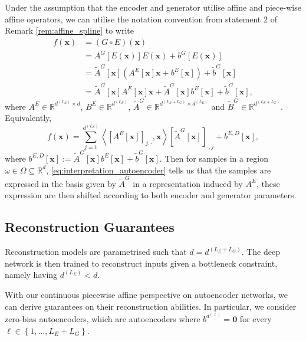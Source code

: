 Under the assumption that the encoder and generator utilise affine and piece-wise affine operators, we can utilise the notation convention from statement 2 of Remark \ref{rem:affine_spline} to write
\begin{align*}
    f(\mathbf{x})&=(G\circ E)(\mathbf{x})\\&=A^G[E(\mathbf{x})]E(\mathbf{x})+b^G[E(\mathbf{x})]\\&=\tilde{A}^G[\mathbf{x}]\left(A^E[\mathbf{x}]\mathbf{x}+b^E[\mathbf{x}]\right)+\tilde{b}^G[\mathbf{x}]\\&=\tilde{A}^G[\mathbf{x}]A^E[\mathbf{x}]\mathbf{x}+\tilde{A}^G[\mathbf{x}]b^E[\mathbf{x}]+\tilde{b}^G[\mathbf{x}],
\end{align*}
where $A^E\in\mathbb{R}^{d^{\left(L_E\right)}\times d}$, $B^E\in\mathbb{R}^{d^{\left(L_E\right)}}$, $\tilde{A}^G\in\mathbb{R}^{d^{\left(L_E+L_G\right)}\times d^{\left(L_E\right)}}$ and $\tilde{B}^G\in\mathbb{R}^{d^{\left(L_E+L_G\right)}}$. Equivalently, 
\begin{equation}\label{eq:interpretation_autoencoder}
    f(\mathbf{x})=\sum_{j=1}^{d^{\left(L_E\right)}}\left\langle\left[A^E[\mathbf{x}]\right]_{j,\cdot},\mathbf{x}\right\rangle\left[\tilde{A}^G[\mathbf{x}]\right]_{\cdot,j}+b^{E,D}[\mathbf{x}],
\end{equation}
where $b^{E,D}[\mathbf{x}]:=\tilde{A}^G[\mathbf{x}]b^E[\mathbf{x}]+\tilde{b}^G[\mathbf{x}]$. Then for samples in a region $\omega\in\Omega\subseteq\mathbb{R}^d$, \eqref{eq:interpretation_autoencoder} tells us that the samples are expressed in the basis given by $\tilde{A}^G$ in a representation induced by $A^E$, these expression are then shifted according to both encoder and generator parameters.

\subsection{Reconstruction Guarantees}

Reconstruction models are parametrised such that $d=d^{\left(L_E+L_G\right)}$. The deep network is then trained to reconstruct inputs given a bottleneck constraint, namely having $d^{\left(L_E\right)}<d$.

With our continuous piecewise affine perspective on autoencoder networks, we can derive guarantees on their reconstruction abilities. In particular, we consider zero-bias autoencoders, which are autoencoders where $b^{d^{(\ell)}}=\mathbf{0}$ for every $\ell\in\left\{1,\dots,L_E+L_G\right\}$.

